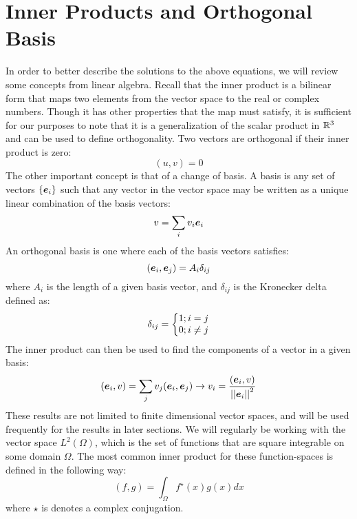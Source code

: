 \documentclass{paper}
\begin{document}
\section{Inner Products and Orthogonal Basis}
In order to better describe the solutions to the above equations, we will review some concepts from linear algebra. Recall that the inner product is a bilinear form that maps two elements from the vector space to the real or complex numbers. Though it has other properties that the map must satisfy, it is sufficient for our purposes to note that it is a generalization of the scalar product in $\mathbb{R}^3$ and can be used to define orthogonality. Two vectors are orthogonal if their inner product is zero:
\begin{equation}
  (u,v)=0
\end{equation}
The other important concept is that of a change of basis. A basis is any set of vectors $\{\bm{e}_{i}\}$ such that any vector in the vector space may be written as a unique linear combination of the basis vectors:
\begin{equation}
  v = \sum_{i} v_i \bm{e}_{i}
\end{equation}
An orthogonal basis is one where each of the basis vectors satisfies:
\begin{equation}
  (\bm{e}_{i},\bm{e}_{j})= A_i \delta_{ij}
\end{equation}
where $A_i$ is the length of a given basis vector, and $\delta_{ij}$ is the Kronecker delta defined as:
\begin{equation}
  \delta_{ij} = \left\{\begin{matrix}
    1; i = j \\
    0; i \neq j
   \end{matrix}\right.
\end{equation}
The inner product can then be used to find the components of a vector in a given basis:
\begin{equation}
  (\bm{e}_{i},v)=\sum_{j} v_j (\bm{e}_{i},\bm{e}_{j})\rightarrow v_i = \frac{(\bm{e}_{i},v)}{\left|\left| \bm{e}_{i}\right|\right|^2}
\end{equation}
These results are not limited to finite dimensional vector spaces, and will be used frequently for the results in later sections. We will regularly be working with the vector space $L^2(\Omega)$, which is the set of functions that are square integrable on some domain $\Omega$. The most common inner product for these function-spaces is defined in the following way:
\begin{equation}
  \boxed{
    (f,g) = \int_\Omega f^\star(x) g(x)dx
  }
\end{equation}
where $\star$ is denotes a complex conjugation. 
\end{document}
